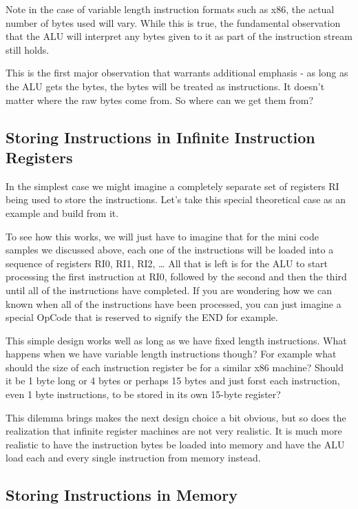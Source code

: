 Note in the case of variable length instruction formats such as x86, the actual number of bytes used will vary. While this is true, the fundamental observation that the ALU will interpret any bytes given to it as part of the instruction stream still holds.

This is the first major observation that warrants additional emphasis - as long as the ALU gets the bytes, the bytes will be treated as instructions. It doesn’t matter where the raw bytes come from. So where can we get them from?

\subsection{Storing Instructions in Infinite Instruction Registers}

In the simplest case we might imagine a completely separate set of registers RI being used to store the instructions. Let’s take this special theoretical case as an example and build from it.

To see how this works, we will just have to imagine that for the mini code samples we discussed above, each one of the instructions will be loaded into a sequence of registers RI0, RI1, RI2, … All that is left is for the ALU to start processing the first instruction at RI0, followed by the second and then the third until all of the instructions have completed. If you are wondering how we can known when all of the instructions have been processed, you can just imagine a special OpCode that is reserved to signify the END for example. 

This simple design works well as long as we have fixed length instructions. What happens when we have variable length instructions though? For example what should the size of each instruction register be for a similar x86 machine? Should it be 1 byte long or 4 bytes or perhaps 15 bytes and just forst each instruction, even 1 byte instructions, to be stored in its own 15-byte register? 

This dilemma brings makes the next design choice a bit obvious, but so does the realization that infinite register machines are not very realistic. It is much more realistic to have the instruction bytes be loaded into memory and have the ALU load each and every single instruction from memory instead. 

\subsection{Storing Instructions in Memory}

